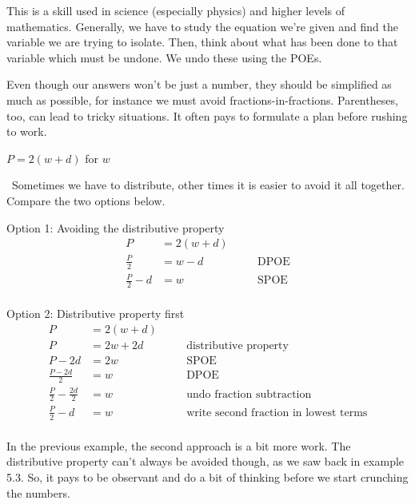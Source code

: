 This is a skill used in science (especially physics) and higher levels of mathematics. Generally, we have to study the equation we're given and find the variable we are trying to isolate. Then, think about what has been done to that variable which must be undone. We undo these using the POEs.


Even though our answers won't be just a number, they should be simplified as much as possible, for instance we must avoid fractions-in-fractions. Parentheses, too, can lead to tricky situations. It often pays to formulate a plan before rushing to work.

\begin{boxedex}
$P = 2( w + d )$ for $w$

\exsoln\ Sometimes we have to distribute, other times it is easier to avoid it all together. Compare the two options below.

Option 1: Avoiding the distributive property
\[\begin{aligned}
P &= 2(w + d)\\
\tfrac{P}{2} &= w - d
&&\quad\text{DPOE}\\
\tfrac{P}{2} - d &= w
&&\quad\text{SPOE}\\
\end{aligned}\]

Option 2: Distributive property first
\[\begin{aligned}
P &= 2(w + d)\\
P &= 2w + 2d
&&\quad\text{distributive property}\\
P - 2d &= 2w
&&\quad\text{SPOE}\\
\tfrac{P - 2d}{2}&= w
&&\quad\text{DPOE}\\
\tfrac{P}{2} - \tfrac{2d}{2}&= w
&&\quad\text{undo fraction subtraction}\\
\tfrac{P}{2} - d&= w
&&\quad\text{write second fraction in lowest terms}\\
\end{aligned}\]
\end{boxedex}

In the previous example, the second approach is a bit more work. The distributive property can't always be avoided though, as we saw back in example 5.3. So, it pays to be observant and do a bit of thinking before we start crunching the numbers.

